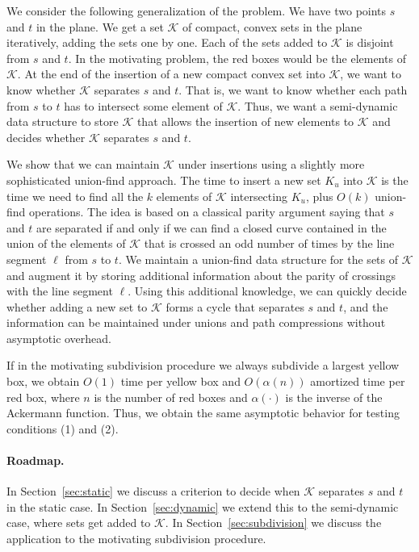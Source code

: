 \documentclass[a4paper,11pt]{article}
\newcommand{\calK}{\mathcal{K}}
\begin{document}
We consider the following generalization of the problem.
We have two points $s$ and $t$ in the plane.
We get a set $\calK$ of compact, convex sets in the plane
iteratively, adding the sets one by one. 
Each of the sets added to $\calK$ is disjoint from $s$ and $t$.
In the motivating problem,
the red boxes would be the elements of $\calK$.
At the end of the insertion of a new compact convex set into $\calK$, 
we want to know whether $\calK$ separates $s$ and $t$. That is,
we want to know whether each path from $s$ to $t$ has to intersect
some element of $\calK$.
Thus, we want a semi-dynamic data structure to store $\calK$ that
allows the insertion of new elements to $\calK$ and decides whether
$\calK$ separates $s$ and $t$.

We show that we can maintain $\calK$ under insertions 
using a slightly more sophisticated union-find approach. 
The time to insert a new set $K_u$ into $\calK$ is the time
we need to find all the $k$ elements of $\calK$ intersecting $K_u$,
plus $O(k)$ union-find operations.
The idea is based on a classical parity argument saying that 
$s$ and $t$ are separated if and only if we
can find a closed curve contained in the union of the elements of $\calK$ 
that is crossed an odd number of times by the line segment $\ell$ from $s$ to $t$. 
We maintain a union-find data structure for the sets of $\calK$ and augment
it by storing additional information about the parity of crossings with the line segment $\ell$.
Using this additional knowledge, we can quickly decide whether adding a new set
to $\calK$ forms a cycle that separates $s$ and $t$, 
and the information can be maintained under unions
and path compressions without asymptotic overhead.

If in the motivating subdivision procedure we always subdivide a largest
yellow box, we obtain $O(1)$ time per yellow box and 
$O(\alpha(n))$ amortized time per red box, where $n$ is the number of red boxes and
$\alpha(\cdot)$ is the inverse of the Ackermann function.
Thus, we obtain the same asymptotic behavior for testing conditions (1) and (2).

\paragraph{Roadmap.}
In Section~\ref{sec:static} we discuss a criterion to decide when $\calK$
separates $s$ and $t$ in the static case.
In Section~\ref{sec:dynamic} we extend this to the semi-dynamic case,
where sets get added to $\calK$.
In Section~\ref{sec:subdivision} we discuss the application to the motivating
subdivision procedure.
\end{document}
